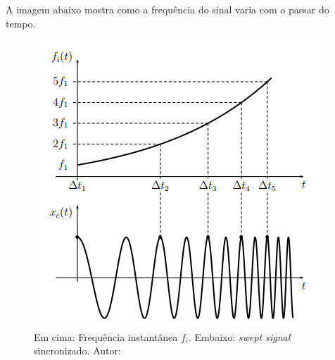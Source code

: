 A imagem abaixo mostra como a frequência do sinal varia com o passar do tempo.
\begin{figure}[!htb]
	\centering
	\includegraphics[width=0.5\linewidth]{figuras/SSS}
	\caption{Em cima: Frequência instantânea $f_{i}$. Embaixo: \textit{swept signal} sincronizado. Autor: \cite{novak2010chebyshev}}
	\label{fig:sss}
\end{figure}
